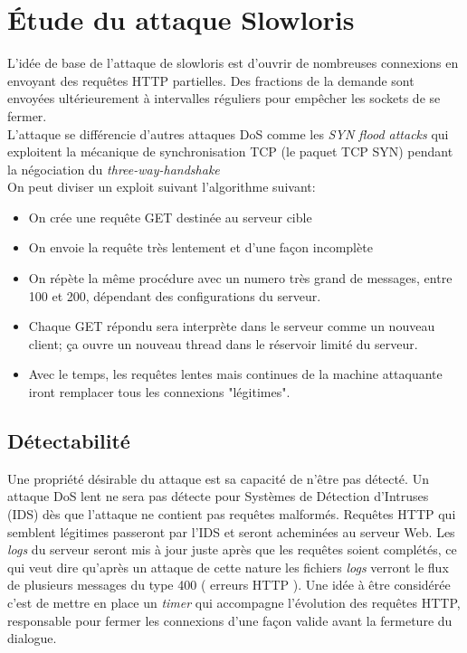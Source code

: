 \documentclass{article}
\begin{document}
\section{Étude du attaque Slowloris}
L'idée de base de l'attaque de slowloris est d'ouvrir de nombreuses connexions en envoyant des requêtes HTTP partielles. Des fractions de la demande sont envoyées ultérieurement à intervalles réguliers pour empêcher les sockets de se fermer. \\
L'attaque se différencie d'autres attaques DoS comme les \textit{SYN flood attacks} qui exploitent la mécanique de synchronisation TCP (le paquet TCP SYN) pendant la négociation du \textit{three-way-handshake} \\
On peut diviser un exploit suivant l'algorithme suivant: \\
\begin{itemize}
	\item On crée une requête GET destinée au serveur cible
	\item On envoie la requête très lentement et d'une façon incomplète
	\item On répète la même procédure avec un numero très grand de messages, entre 100 et 200, dépendant des configurations du serveur.
	\item Chaque GET répondu sera interprète dans le serveur comme un nouveau client; ça ouvre un nouveau thread dans le réservoir limité du serveur.
	\item Avec le temps, les requêtes lentes mais continues de la machine attaquante iront remplacer tous les connexions "légitimes".
\end{itemize}

\subsection{Détectabilité}
Une propriété désirable du attaque est sa capacité de n'être pas détecté. Un attaque DoS lent ne sera pas détecte pour Systèmes de Détection d'Intruses (IDS) dès que l'attaque ne contient pas requêtes malformés. Requêtes HTTP qui semblent légitimes passeront par l'IDS et seront acheminées au serveur Web. Les \textit{logs} du serveur seront mis à jour juste après que les requêtes soient complétés, ce qui veut dire qu'après un attaque de cette nature les fichiers \textit{logs} verront le flux de plusieurs messages du type 400 ( erreurs HTTP ). Une idée à être considérée c'est de mettre en place un \textit{timer} qui accompagne l'évolution des requêtes HTTP, responsable pour fermer les connexions d'une façon valide avant la fermeture du dialogue.
\end{document}
